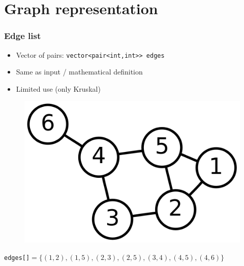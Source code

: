 \documentclass[12pt]{beamer}
\begin{document}
\section{Graph representation}

\begin{frame}
\frametitle{Edge list}
\begin{itemize}
\item Vector of pairs: \texttt{vector<pair<int,int>> edges}
\item Same as input / mathematical definition
\item Limited use (only Kruskal)
\end{itemize}
\begin{figure}
\centering
\includegraphics[width=0.5\linewidth]{img/6n-graph}
\end{figure}
\begin{center}
\texttt{edges[]}$ = \{(1,2),(1,5),(2,3),(2,5),(3,4),(4,5),(4,6)\}$
\end{center}
\end{frame}
\end{document}
